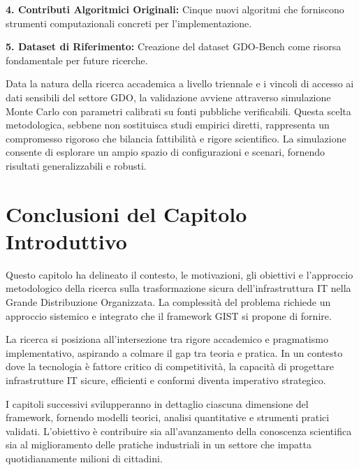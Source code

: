 \textbf{4. Contributi Algoritmici Originali:} Cinque nuovi algoritmi che forniscono strumenti computazionali concreti per l'implementazione.

\textbf{5. Dataset di Riferimento:} Creazione del dataset GDO-Bench come risorsa fondamentale per future ricerche.

Data la natura della ricerca accademica a livello triennale e i vincoli di accesso ai dati sensibili del settore GDO, la validazione avviene attraverso simulazione Monte Carlo con parametri calibrati su fonti pubbliche verificabili. Questa scelta metodologica, sebbene non sostituisca studi empirici diretti, rappresenta un compromesso rigoroso che bilancia fattibilità e rigore scientifico. La simulazione consente di esplorare un ampio spazio di configurazioni e scenari, fornendo risultati generalizzabili e robusti.

\section{\texorpdfstring{Conclusioni del Capitolo Introduttivo}{1.8 - Conclusioni del Capitolo Introduttivo}}
\label{sec:conclusioni_cap1}

Questo capitolo ha delineato il contesto, le motivazioni, gli obiettivi e l'approccio metodologico della ricerca sulla trasformazione sicura dell'infrastruttura IT nella Grande Distribuzione Organizzata. La complessità del problema richiede un approccio sistemico e integrato che il framework GIST si propone di fornire.

La ricerca si posiziona all'intersezione tra rigore accademico e pragmatismo implementativo, aspirando a colmare il gap tra teoria e pratica. In un contesto dove la tecnologia è fattore critico di competitività, la capacità di progettare infrastrutture IT sicure, efficienti e conformi diventa imperativo strategico.

I capitoli successivi svilupperanno in dettaglio ciascuna dimensione del framework, fornendo modelli teorici, analisi quantitative e strumenti pratici validati. L'obiettivo è contribuire sia all'avanzamento della conoscenza scientifica sia al miglioramento delle pratiche industriali in un settore che impatta quotidianamente milioni di cittadini.

\clearpage
\printbibliography[
    heading=subbibliography,
    title={Riferimenti Bibliografici del Capitolo 1},
]

